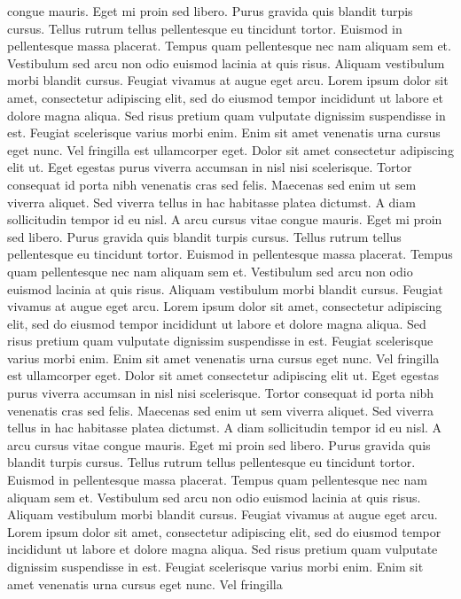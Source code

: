 congue mauris. Eget mi proin sed libero. Purus gravida quis blandit
turpis cursus. Tellus rutrum tellus pellentesque eu tincidunt tortor.
Euismod in pellentesque massa placerat. Tempus quam pellentesque nec nam
 aliquam sem et. Vestibulum sed arcu non odio euismod lacinia at quis
risus. Aliquam vestibulum morbi blandit cursus. Feugiat vivamus at augue
 eget arcu.
Lorem
 ipsum dolor sit amet, consectetur adipiscing elit, sed do eiusmod
tempor incididunt ut labore et dolore magna aliqua. Sed risus pretium
quam vulputate dignissim suspendisse in est. Feugiat scelerisque varius
morbi enim. Enim sit amet venenatis urna cursus eget nunc. Vel fringilla
 est ullamcorper eget. Dolor sit amet consectetur adipiscing elit ut.
Eget egestas purus viverra accumsan in nisl nisi scelerisque. Tortor
consequat id porta nibh venenatis cras sed felis. Maecenas sed enim ut
sem viverra aliquet. Sed viverra tellus in hac habitasse platea
dictumst. A diam sollicitudin tempor id eu nisl. A arcu cursus vitae
congue mauris. Eget mi proin sed libero. Purus gravida quis blandit
turpis cursus. Tellus rutrum tellus pellentesque eu tincidunt tortor.
Euismod in pellentesque massa placerat. Tempus quam pellentesque nec nam
 aliquam sem et. Vestibulum sed arcu non odio euismod lacinia at quis
risus. Aliquam vestibulum morbi blandit cursus. Feugiat vivamus at augue
 eget arcu.
Lorem
 ipsum dolor sit amet, consectetur adipiscing elit, sed do eiusmod
tempor incididunt ut labore et dolore magna aliqua. Sed risus pretium
quam vulputate dignissim suspendisse in est. Feugiat scelerisque varius
morbi enim. Enim sit amet venenatis urna cursus eget nunc. Vel fringilla
 est ullamcorper eget. Dolor sit amet consectetur adipiscing elit ut.
Eget egestas purus viverra accumsan in nisl nisi scelerisque. Tortor
consequat id porta nibh venenatis cras sed felis. Maecenas sed enim ut
sem viverra aliquet. Sed viverra tellus in hac habitasse platea
dictumst. A diam sollicitudin tempor id eu nisl. A arcu cursus vitae
congue mauris. Eget mi proin sed libero. Purus gravida quis blandit
turpis cursus. Tellus rutrum tellus pellentesque eu tincidunt tortor.
Euismod in pellentesque massa placerat. Tempus quam pellentesque nec nam
 aliquam sem et. Vestibulum sed arcu non odio euismod lacinia at quis
risus. Aliquam vestibulum morbi blandit cursus. Feugiat vivamus at augue
 eget arcu.
Lorem
 ipsum dolor sit amet, consectetur adipiscing elit, sed do eiusmod
tempor incididunt ut labore et dolore magna aliqua. Sed risus pretium
quam vulputate dignissim suspendisse in est. Feugiat scelerisque varius
morbi enim. Enim sit amet venenatis urna cursus eget nunc. Vel fringilla
